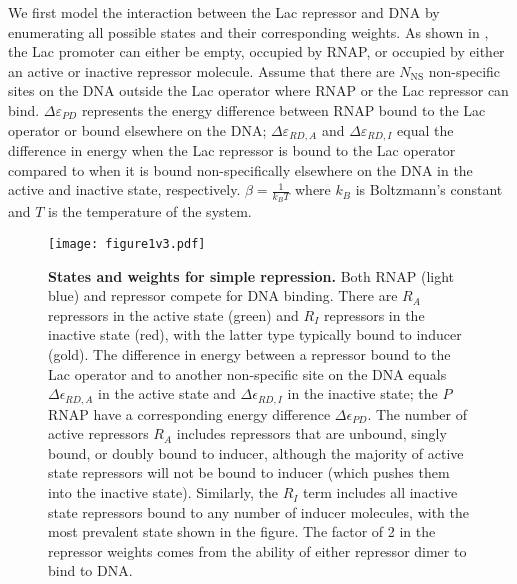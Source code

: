 We first model the interaction between the Lac repressor and DNA by enumerating
all possible states and their corresponding weights. As shown in
\fref[figpolymeraseRepressorStates], the Lac promoter can either be empty,
occupied by RNAP, or occupied by either an active or inactive repressor
molecule. Assume that there are $N_{\text{NS}}$ non-specific sites on the DNA outside
the Lac operator where RNAP or the Lac repressor can bind. \(\Delta\varepsilon_{PD}\)
represents the energy difference between RNAP bound to the Lac operator or bound
elsewhere on the DNA; \(\Delta\varepsilon_{RD,A}\) and \(\Delta\varepsilon_{RD,I}\) equal the
difference in energy when the Lac repressor is bound to the Lac operator
compared to when it is bound non-specifically elsewhere on the DNA in the active
and inactive state, respectively. $\beta = \frac{1}{k_BT}$ where $k_B$ is
Boltzmann's constant and $T$ is the temperature of the system.

\begin{figure}[h]
	\centering \texttt{[image: figure1v3.pdf]}
	\caption{{\bf States and weights for simple repression.}  Both RNAP (light blue)
		and repressor compete for DNA binding. There are $R_A$ repressors in the active
		state (green) and $R_I$ repressors in the inactive state (red), with the latter
		type typically bound to inducer (gold). The difference in energy between a
		repressor bound to the Lac operator and to another non-specific site on the DNA
		equals $\Delta\epsilon_{RD,A}$ in the active state and $\Delta\epsilon_{RD,I}$
		in the inactive state; the $P$ RNAP have a corresponding energy difference
		$\Delta\epsilon_{PD}$. The number of active repressors $R_A$ includes
		repressors that are unbound, singly bound, or doubly bound to inducer, although
		the majority of active state repressors will not be bound to inducer (which
		pushes them into the inactive state). Similarly, the $R_I$ term includes all
		inactive state repressors bound to any number of inducer molecules, with the
		most prevalent state shown in the figure. The factor of 2 in the repressor
		weights comes from the ability of either repressor dimer to bind to DNA. }
	\label{figpolymeraseRepressorStates}
\end{figure}



